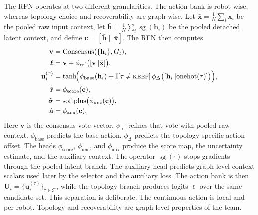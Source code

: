 \documentclass{ieeeaccess}
\newcommand{\cT}{\mathcal{T}}
\newcommand{\bfu}{\mathbf{u}}
\begin{document}
The RFN operates at two different granularities. The action bank is robot-wise, whereas topology choice and recoverability are graph-wise. Let $\bar{\mathbf{x}}=\frac{1}{N}\sum_i \mathbf{x}_i$ be the pooled raw input context, let $\bar{\mathbf{h}}=\frac{1}{N}\sum_i \operatorname{sg}(\mathbf{h}_i)$ be the pooled detached latent context, and define $\mathbf{c}=[\bar{\mathbf{h}}\|\bar{\mathbf{x}}]$. The RFN then computes
{\small
\begin{equation}
\begin{aligned}
\mathbf{v} &= \mathrm{Consensus}(\{\mathbf{h}_i\}, G_t), \\
\bm{\ell} &= \mathbf{v} + \phi_{\mathrm{ref}}
\bigl([\mathbf{v}\|\bar{\mathbf{x}}]\bigr), \\
\bfu_i^{(\tau)} &= \tanh\!\Bigl(
\phi_{\mathrm{base}}(\mathbf{h}_i) +
\mathbb{I}[\tau \neq \textsc{keep}] \,
\phi_{\Delta}\bigl([\mathbf{h}_i\|\mathrm{onehot}(\tau)]\bigr)
\Bigr), \\
\hat{\mathbf{r}} &= \phi_{\mathrm{score}}(\mathbf{c}), \\
\hat{\bm{\sigma}} &= \mathrm{softplus}\bigl(\phi_{\mathrm{unc}}(\mathbf{c})\bigr), \\
\hat{\mathbf{a}} &= \phi_{\mathrm{aux}}(\mathbf{c}),
\end{aligned}
\label{eq:rfn_heads}
\end{equation}
}
Here $\mathbf{v}$ is the consensus vote vector.
$\phi_{\mathrm{ref}}$ refines that vote with pooled raw context.
$\phi_{\mathrm{base}}$ predicts the base action.
$\phi_{\Delta}$ predicts the topology-specific action offset.
The heads $\phi_{\mathrm{score}}$, $\phi_{\mathrm{unc}}$, and
$\phi_{\mathrm{aux}}$ produce the score map, the uncertainty estimate,
and the auxiliary context. The operator $\operatorname{sg}(\cdot)$
stops gradients through the pooled latent branch. The auxiliary head
predicts graph-level context scalars used later by the selector and the
auxiliary loss. The action bank is then
$\mathbf{U}_i=\{\bfu_i^{(\tau)}\}_{\tau\in\cT}$, while the topology
branch produces logits $\bm{\ell}$ over the same candidate set. This
separation is deliberate. The continuous action is local and per-robot.
Topology and recoverability are graph-level properties of the team.
\end{document}
